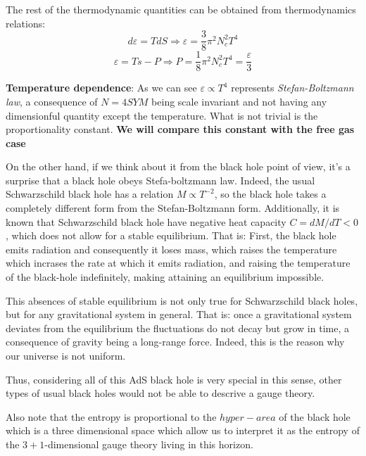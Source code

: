 \documentclass[12pt]{article}
\begin{document}
The rest of the thermodynamic quantities can be obtained from thermodynamics relations:
\[
    d\varepsilon = TdS \Rightarrow \varepsilon = \frac{3}{8} \pi^2 N_c^2T^4
\]
\[
    \varepsilon = Ts - P \Rightarrow P = \frac{1}{8} \pi^2 N_c^2T^4 = \frac{\varepsilon}{3}
\]

\textbf{Temperature dependence}: As we can see $\varepsilon\propto T^4$ represents \textit{Stefan-Boltzmann law}, a consequence of $N=4 SYM$ being scale invariant and not having any dimensionful quantity except the temperature. What is not trivial is the proportionality constant. \textbf{We will compare this constant with the free gas case}

\vspace{.25cm}

On the other hand, if we think about it from the black hole point of view, it's a surprise that a black hole obeys Stefa-boltzmann law. Indeed, the usual Schwarzschild black hole has a relation $M\propto T^{-2}$, so the black hole takes a completely different form from the Stefan-Boltzmann form. Additionally, it is known that Schwarzschild black hole have negative heat capacity $C=dM/dT<0$, which does not allow for a stable equilibrium. That is: First, the black hole emits radiation and consequently it loses mass, which raises the temperature which incrases the rate at which it emits radiation, and raising the temperature of the black-hole indefinitely, making attaining an equilibrium impossible.

\vspace{.25cm}

This absences of stable equilibrium is not only true for Schwarzschild black holes, but for any gravitational system in general. That is: once a gravitational system deviates from the equilibrium the fluctuations do not decay but grow in time, a consequence of gravity being a long-range force. Indeed, this is the reason why our universe is not uniform.

\vspace{.25cm}

Thus, considering all of this AdS black hole is very special in this sense, other types of usual black holes would not be able to descrive a gauge theory.

Also note that the entropy is proportional to the $hyper-area$ of the black hole which is a three dimensional space which allow us to interpret it as the entropy of the $3+1$-dimensional gauge theory living in this horizon.

\vspace{.25cm}
\end{document}
